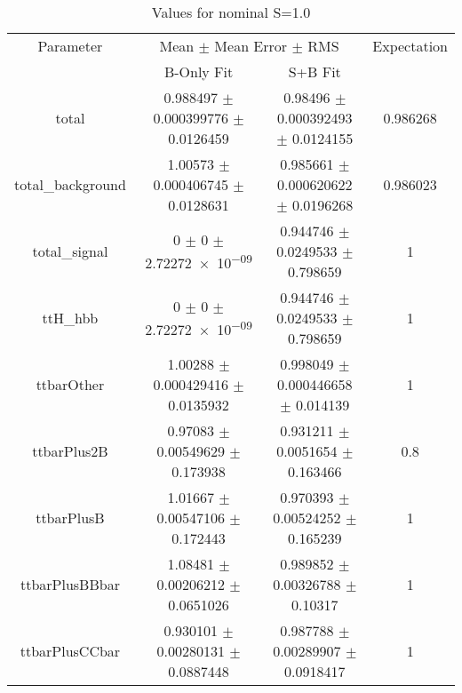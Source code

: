 \begin{table}
\centering
\caption{Values for nominal S=1.0}
\begin{tabular}{cccc}
\toprule
Parameter & \multicolumn{2}{c}{Mean $\pm$ Mean Error $\pm$ RMS} & Expectation\\
 & B-Only Fit & S+B Fit & \\
\midrule
total & \num{0.988497} $\pm$ \num{0.000399776} $\pm$ \num{0.0126459} & \num{0.98496} $\pm$ \num{0.000392493} $\pm$ \num{0.0124155} & \num{0.986268}\\
total\_background & \num{1.00573} $\pm$ \num{0.000406745} $\pm$ \num{0.0128631} & \num{0.985661} $\pm$ \num{0.000620622} $\pm$ \num{0.0196268} & \num{0.986023}\\
total\_signal & \num{0} $\pm$ \num{0} $\pm$ \num{2.72272e-09} & \num{0.944746} $\pm$ \num{0.0249533} $\pm$ \num{0.798659} & \num{1}\\
ttH\_hbb & \num{0} $\pm$ \num{0} $\pm$ \num{2.72272e-09} & \num{0.944746} $\pm$ \num{0.0249533} $\pm$ \num{0.798659} & \num{1}\\
ttbarOther & \num{1.00288} $\pm$ \num{0.000429416} $\pm$ \num{0.0135932} & \num{0.998049} $\pm$ \num{0.000446658} $\pm$ \num{0.014139} & \num{1}\\
ttbarPlus2B & \num{0.97083} $\pm$ \num{0.00549629} $\pm$ \num{0.173938} & \num{0.931211} $\pm$ \num{0.0051654} $\pm$ \num{0.163466} & \num{0.8}\\
ttbarPlusB & \num{1.01667} $\pm$ \num{0.00547106} $\pm$ \num{0.172443} & \num{0.970393} $\pm$ \num{0.00524252} $\pm$ \num{0.165239} & \num{1}\\
ttbarPlusBBbar & \num{1.08481} $\pm$ \num{0.00206212} $\pm$ \num{0.0651026} & \num{0.989852} $\pm$ \num{0.00326788} $\pm$ \num{0.10317} & \num{1}\\
ttbarPlusCCbar & \num{0.930101} $\pm$ \num{0.00280131} $\pm$ \num{0.0887448} & \num{0.987788} $\pm$ \num{0.00289907} $\pm$ \num{0.0918417} & \num{1}\\
\bottomrule
\end{tabular}
\end{table}